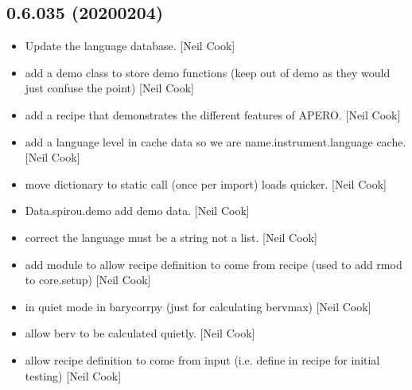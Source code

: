 \documentclass[a4paper,10pt,english]{report}
\begin{document}
\subsection{0.6.035 (2020\sphinxhyphen{}02\sphinxhyphen{}04)}
\label{\detokenize{misc/changelog:id3}}\begin{itemize}
\item {} 
Update the language database. {[}Neil Cook{]}

\item {} 
 \sphinxhyphen{} add a demo class to store demo
functions (keep out of demo as they would just confuse the point)
{[}Neil Cook{]}

\item {} 
 \sphinxhyphen{} add a recipe that demonstrates the
different features of APERO. {[}Neil Cook{]}

\item {} 
 \sphinxhyphen{} add a language level in cache data so we are
name.instrument.language cache. {[}Neil Cook{]}

\item {} 
 \sphinxhyphen{} move dictionary to static call (once per
import) \textendash{} loads quicker. {[}Neil Cook{]}

\item {} 
Data.spirou.demo \sphinxhyphen{} add demo data. {[}Neil Cook{]}

\item {} 
 \sphinxhyphen{} correct the language must be a string not a
list. {[}Neil Cook{]}

\item {} 
 \sphinxhyphen{} add module to allow recipe definition to come
from recipe (used to add rmod to core.setup) {[}Neil Cook{]}

\item {} 
 \sphinxhyphen{}  in quiet mode in barycorrpy (just
for calculating bervmax) {[}Neil Cook{]}

\item {} 
 \sphinxhyphen{} allow berv to be calculated quietly. {[}Neil
Cook{]}

\item {} 
 \sphinxhyphen{} allow recipe definition to come from input
(i.e. define in recipe \sphinxhyphen{} for initial testing) {[}Neil Cook{]}


\end{itemize}
\end{document}
